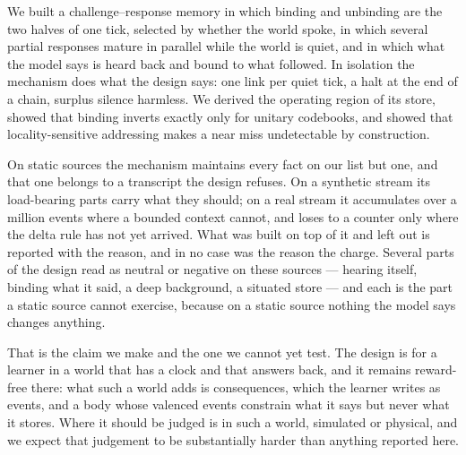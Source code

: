\documentclass[11pt,a4paper]{article}
\theoremstyle{plain}
\theoremstyle{definition}
\theoremstyle{remark}
\begin{document}
We built a challenge--response memory in which binding and unbinding are the two
halves of one tick, selected by whether the world spoke, in which several
partial responses mature in parallel while the world is quiet, and in which what
the model says is heard back and bound to what followed. In isolation the
mechanism does what the design says: one link per quiet tick, a halt at the end
of a chain, surplus silence harmless. We derived the operating region of its
store, showed that binding inverts exactly only for unitary codebooks, and
showed that locality-sensitive addressing makes a near miss undetectable by
construction.

On static sources the mechanism maintains every fact on our list but one, and
that one belongs to a transcript the design refuses. On a synthetic stream its
load-bearing parts carry what they should; on a real stream it accumulates over
a million events where a bounded context cannot, and loses to a counter only
where the delta rule has not yet arrived. What was built on top of it and left
out is reported with the reason, and in no case was the reason the charge.
Several parts of the design read as neutral or negative on these sources ---
hearing itself, binding what it said, a deep background, a situated store ---
and each is the part a static source cannot exercise, because on a static source
nothing the model says changes anything.

That is the claim we make and the one we cannot yet test. The design is for a
learner in a world that has a clock and that answers back, and it remains
reward-free there: what such a world adds is consequences, which the learner
writes as events, and a body whose valenced events constrain what it says but
never what it stores. Where it should be
judged is in such a world, simulated or physical, and we expect that judgement
to be substantially harder than anything reported here.
\end{document}
